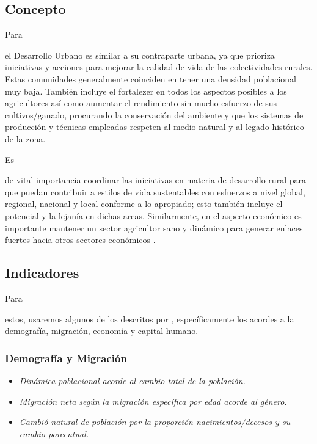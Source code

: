 \documentclass[stu, 12pt, letterpaper, donotrepeattitle, floatsintext, natbib]{apa7}
\begin{document}
\subsection{Concepto}
Para \begin{justifying}
    \cite{corvo-2020} %
    el Desarrollo Urbano es similar a su contraparte urbana, ya que prioriza iniciativas y acciones para mejorar la calidad
    de vida de las colectividades rurales. Estas comunidades generalmente coinciden en tener una densidad poblacional muy baja.
    También incluye el fortalezer en todos los aspectos posibles a los agricultores así como aumentar el rendimiento sin mucho esfuerzo
    de sus cultivos/ganado, procurando la conservación del ambiente y que los sistemas de producción y técnicas empleadas respeten al medio
    natural y al legado histórico de la zona.\par
\end{justifying}
Es \begin{justifying}
    de vital importancia coordinar las iniciativas en materia de desarrollo rural para que puedan contribuir a estilos de vida sustentables
    con esfuerzos a nivel global, regional, nacional y local conforme a lo apropiado; esto también incluye el potencial y la lejanía en dichas areas.
    Similarmente, en el aspecto económico es importante mantener un sector agricultor sano y dinámico para generar enlaces fuertes hacia otros sectores
    económicos \citep{unknown-author-no-dateB}.\par %
\end{justifying}
\vspace{\baselineskip}
\subsection{Indicadores}
Para \begin{justifying}
    estos, usaremos algunos de los descritos por \cite{statistics-austria-2006}, %
    específicamente los acordes a la demografía, migración, economía y capital humano.\par
\end{justifying}
\vspace{\baselineskip}
\subsubsection{Demografía y Migración}
\begin{justifying}
    \begin{itemize}
        \item \emph{Dinámica poblacional acorde al cambio total de la población.}
        \item \emph{Migración neta según la migración específica por edad acorde al género.}
        \item \emph{Cambió natural de población por la proporción nacimientos/decesos y su cambio porcentual.}
    \end{itemize}\par
\end{justifying}
\vspace{\baselineskip}
\end{document}
